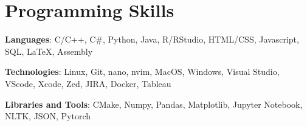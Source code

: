 \documentclass[letterpaper,11pt]{article}
\begin{document}
\section{Programming Skills}
 \begin{itemize}[leftmargin=0.15in, label={}]
    \small{\item{

     \textbf{Languages}{: C/C++, C\#, Python, Java, R/RStudio, HTML/CSS, 
Javascript, SQL, LaTeX, Assembly} $ $

     \textbf{Technologies}{: Linux, Git, nano, nvim, MacOS, Windows, 
Visual Studio, VScode, Xcode, Zed, JIRA, Docker, Tableau} $ $

     \textbf{Libraries and Tools}{: CMake, Numpy, Pandas, Matplotlib, 
Jupyter Notebook, NLTK, JSON, Pytorch} $ $  
    }}
 \end{itemize}
\end{document}
